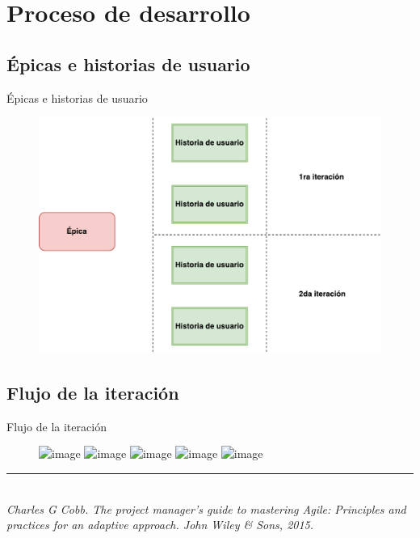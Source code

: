 \documentclass[10pt,xcolor=table ]{beamer}
\newcommand{\decoRule}{\rule{\textwidth}{.4pt}} %
\begin{document}
\section{Proceso de desarrollo}
\subsection{Épicas e historias de usuario}
\begin{frame}{Épicas e historias de usuario}
	\begin{figure}
		\centering
	    \includegraphics[scale=0.5]{../Figuras/epic_diagram}
	\end{figure}
\end{frame}

\subsection{Flujo de la iteración}
\begin{frame}{Flujo de la iteración}
	\begin{figure}
		\centering
		\includegraphics<1>[scale=0.235]{../Figuras/flujo_scrum_1}
		\includegraphics<2>[scale=0.235]{../Figuras/flujo_scrum_2}
		\includegraphics<3>[scale=0.235]{../Figuras/flujo_scrum_3}
		\includegraphics<4>[scale=0.235]{../Figuras/flujo_scrum_4}
		\includegraphics<5>[scale=0.235]{../Figuras/flujo_scrum_5}
	\end{figure}
	\decoRule \\
  	\tiny \textit{Charles G Cobb. The project manager’s guide to mastering Agile: Principles and practices for an adaptive approach. John Wiley \& Sons, 2015.} \\
\end{frame}
\end{document}
